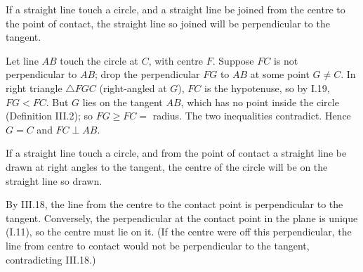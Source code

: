 \begin{claim}
\label{prop:III.18}
If a straight line touch a circle, and a straight line be joined
from the centre to the point of contact, the straight line so joined
will be perpendicular to the tangent.
\end{claim}
\begin{evidence}
\label{ev:III.18}
Let line $AB$ touch the circle at $C$, with centre $F$.  Suppose $FC$
is not perpendicular to $AB$; drop the perpendicular $FG$ to $AB$
at some point $G \neq C$.  In right triangle $\triangle FGC$
(right-angled at $G$), $FC$ is the hypotenuse, so by I.19, $FG <
FC$.  But $G$ lies on the tangent $AB$, which has no point inside
the circle (Definition III.2); so $FG \geq FC = $ radius.  The two
inequalities contradict.  Hence $G = C$ and $FC \perp AB$.
\end{evidence}

\begin{claim}
\label{prop:III.19}
If a straight line touch a circle, and from the point of contact a
straight line be drawn at right angles to the tangent, the centre of
the circle will be on the straight line so drawn.
\end{claim}
\begin{evidence}
\label{ev:III.19}
By III.18, the line from the centre to the contact point is
perpendicular to the tangent.  Conversely, the perpendicular at the
contact point in the plane is unique (I.11), so the centre must lie
on it.  (If the centre were off this perpendicular, the line from
centre to contact would not be perpendicular to the tangent,
contradicting III.18.)
\end{evidence}

